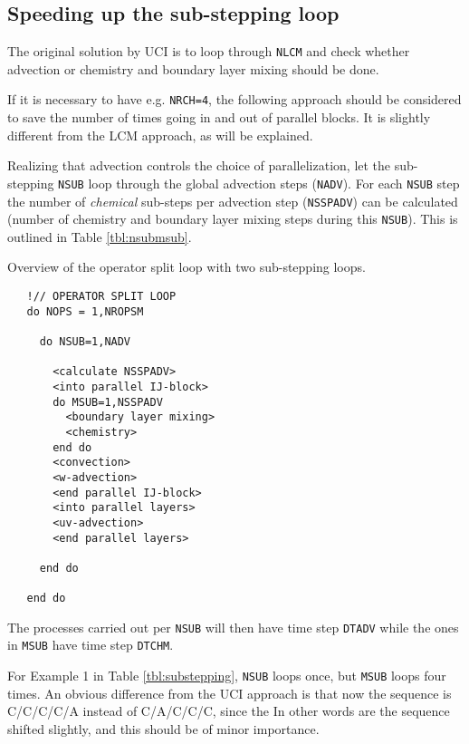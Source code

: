 \subsection{Speeding up the sub-stepping loop}
\label{app:substepping_faster}
The original solution by UCI is to loop through \verb#NLCM# and check
whether advection or chemistry and boundary layer mixing should be
done.

If it is necessary to have e.g. \verb#NRCH=4#, the following approach
should be considered to save the number of times going in and out of
parallel blocks. It is slightly different from the LCM approach, as
will be explained.

Realizing that advection controls the choice of parallelization, let
the sub-stepping \verb#NSUB# loop through the global advection steps
(\verb#NADV#). For each \verb#NSUB# step the number of {\it chemical}
sub-steps per advection step (\verb#NSSPADV#) can be calculated
(number of chemistry and boundary layer mixing steps during this
\verb#NSUB#).
This is outlined in Table \ref{tbl:nsubmsub}.
\begin{table}[t!]
  \caption{Overview of the operator split loop with two sub-stepping
    loops.}
  \label{tbl:nsubmsub}
\begin{minipage}{\linewidth}
\strek
\vspace{-1mm}
\begin{verbatim}
   !// OPERATOR SPLIT LOOP
   do NOPS = 1,NROPSM

     do NSUB=1,NADV

       <calculate NSSPADV>
       <into parallel IJ-block>
       do MSUB=1,NSSPADV
         <boundary layer mixing>
         <chemistry>
       end do
       <convection>
       <w-advection>
       <end parallel IJ-block>
       <into parallel layers>
       <uv-advection>
       <end parallel layers>

     end do

   end do
\end{verbatim}
\vspace{-4mm}\strek
\end{minipage}
\end{table}

The processes carried out per \verb#NSUB# will then have time step
\verb#DTADV# while the ones in \verb#MSUB# have time step
\verb#DTCHM#.

For Example 1 in Table \ref{tbl:substepping}, \verb#NSUB# loops once,
but \verb#MSUB# loops four times.
An obvious difference from the UCI approach is that now the sequence
is C/C/C/C/A instead of C/A/C/C/C, since the 
In other words are the sequence shifted slightly, and this should be
of minor importance.

